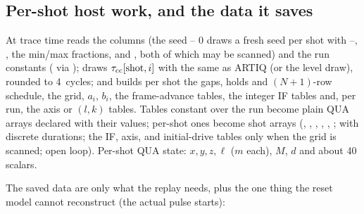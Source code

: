\subsection{Per-shot host work, and the data it saves}
\label{sec:feedback:data}

At trace time  reads the columns (the seed
-- 0 draws a fresh seed per shot with  --,
, the min/max fractions,
 and ,
both of which may be scanned) and the run constants (
via ); draws $\tau_{\rm cc}[\mathrm{shot}, i]$ with the same
 as ARTIQ (or the level draw), rounded to
4\nsu\ cycles; and builds per shot the gaps, holds and $(N{+}1)$-row schedule,
the grid, $a_i$, $b_i$, the frame-advance tables, the integer IF tables and,
per run, the axis or $(l, k)$ tables. Tables constant over the run become
plain QUA arrays declared with their values; per-shot ones become shot arrays
(, , ,
, , ;
 with discrete durations; the IF, axis,  and
initial-drive tables only when the grid is scanned;
 open loop). Per-shot QUA state: $x, y, z, \ell$
($m$ each), $M$, $d$ and about 40 scalars.

The saved data are only what the replay needs, plus the one thing the reset
model cannot reconstruct (the actual pulse starts):

